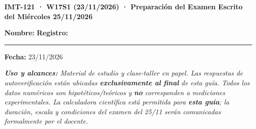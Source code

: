 \documentclass[11pt, a4paper]{article}
\begin{document}
\begin{tcolorbox}[colback=ucbblue!5!white, colframe=ucbblue, title=\textbf{Artefacto A1: Guía de Ejercicios Preparatoria EC4 — Estudiantes}]
    \centering \textbf{IMT-121 · W17S1 (23/11/2026) · Preparación del Examen Escrito del Miércoles 25/11/2026}
\end{tcolorbox}

\noindent\textbf{Nombre:} \hrulefill \quad \textbf{Registro:} \rule{3.5cm}{0.4pt} \quad \textbf{Fecha:} 23/11/2026

\vspace{0.15cm}
\noindent\textit{\textbf{Uso y alcances:} Material de estudio y clase-taller en papel. Las respuestas de autoverificación están ubicadas \textbf{exclusivamente al final} de esta guía. Todos los datos numéricos son hipotéticos/teóricos y \textbf{no} corresponden a mediciones experimentales. La calculadora científica está permitida para \textbf{esta guía}; la duración, escala y condiciones del examen del 25/11 serán comunicadas formalmente por el docente.}
\end{document}
